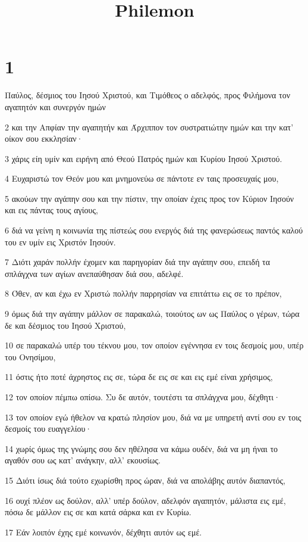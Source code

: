 

\title{Philemon}


\chapter{1}

\par Παύλος, δέσμιος του Ιησού Χριστού, και Τιμόθεος ο αδελφός, προς Φιλήμονα τον αγαπητόν και συνεργόν ημών
\par 2 και την Απφίαν την αγαπητήν και Άρχιππον τον συστρατιώτην ημών και την κατ' οίκον σου εκκλησίαν·
\par 3 χάρις είη υμίν και ειρήνη από Θεού Πατρός ημών και Κυρίου Ιησού Χριστού.
\par 4 Ευχαριστώ τον Θεόν μου και μνημονεύω σε πάντοτε εν ταις προσευχαίς μου,
\par 5 ακούων την αγάπην σου και την πίστιν, την οποίαν έχεις προς τον Κύριον Ιησούν και εις πάντας τους αγίους,
\par 6 διά να γείνη η κοινωνία της πίστεώς σου ενεργός διά της φανερώσεως παντός καλού του εν υμίν εις Χριστόν Ιησούν.
\par 7 Διότι χαράν πολλήν έχομεν και παρηγορίαν διά την αγάπην σου, επειδή τα σπλάγχνα των αγίων ανεπαύθησαν διά σου, αδελφέ.
\par 8 Όθεν, αν και έχω εν Χριστώ πολλήν παρρησίαν να επιτάττω εις σε το πρέπον,
\par 9 όμως διά την αγάπην μάλλον σε παρακαλώ, τοιούτος ων ως Παύλος ο γέρων, τώρα δε και δέσμιος του Ιησού Χριστού,
\par 10 σε παρακαλώ υπέρ του τέκνου μου, τον οποίον εγέννησα εν τοις δεσμοίς μου, υπέρ του Ονησίμου,
\par 11 όστις ήτο ποτέ άχρηστος εις σε, τώρα δε εις σε και εις εμέ είναι χρήσιμος,
\par 12 τον οποίον πέμπω οπίσω. Συ δε αυτόν, τουτέστι τα σπλάγχνα μου, δέχθητι·
\par 13 τον οποίον εγώ ήθελον να κρατώ πλησίον μου, διά να με υπηρετή αντί σου εν τοις δεσμοίς του ευαγγελίου·
\par 14 χωρίς όμως της γνώμης σου δεν ηθέλησα να κάμω ουδέν, διά να μη ήναι το αγαθόν σου ως κατ' ανάγκην, αλλ' εκουσίως.
\par 15 Διότι ίσως διά τούτο εχωρίσθη προς ώραν, διά να απολάβης αυτόν διαπαντός,
\par 16 ουχί πλέον ως δούλον, αλλ' υπέρ δούλον, αδελφόν αγαπητόν, μάλιστα εις εμέ, πόσω δε μάλλον εις σε και κατά σάρκα και εν Κυρίω.
\par 17 Εάν λοιπόν έχης εμέ κοινωνόν, δέχθητι αυτόν ως εμέ.
